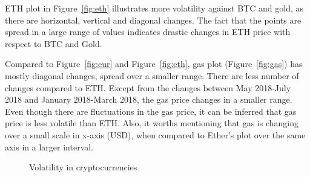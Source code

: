 ETH plot in Figure~\ref{fig:eth} illustrates more volatility against BTC and gold, as there are horizontal, vertical and diagonal changes. The fact that the points are spread in a large range of values indicates drastic changes in ETH price with respect to BTC and Gold.

Compared to Figure~\ref{fig:eur} and Figure~\ref{fig:eth}, gas plot (Figure~\ref{fig:gas}) has mostly diagonal changes, spread over a smaller range. There are less number of changes compared to ETH. Except from the changes between May 2018-July 2018 and January 2018-March 2018, the gas price changes in a smaller range. Even though there are fluctuations in the gas price, it can be inferred that gas price is less volatile than ETH. Also, it worths mentioning that gas is changing over a small scale in x-axis (USD), when compared to Ether's plot over the same axis in a larger interval.


\begin{figure}[!htb]
	\centering
	\hfill
	\caption{Volatility in cryptocurrencies}
	\label{fig:fiatandcrypto}
\end{figure}



